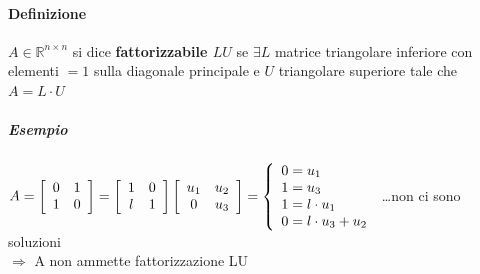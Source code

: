 \documentclass[10pt]{book}
\begin{document}
\paragraph{Definizione} $A \in \mathbb{R}^{n \times n}$ si dice \textbf{fattorizzabile $LU$} se $\exists L$ matrice triangolare inferiore con elementi $= 1$ sulla diagonale principale e $U$ triangolare superiore tale che $A = L\cdot U$
\subparagraph{Esempio} \begin{math}
A = \left[
\begin{array}{c c}
	0 & 1\\
	1 & 0
\end{array}
\right]
= \left[
\begin{array}{c c}
	1 & 0\\
	l & 1
\end{array}
\right]
\left[
\begin{array}{c c}
	u_1 & u_2\\
	0 & u_3
\end{array}
\right]
= \left\{
\begin{array}{l}
	0 = u_1\\
	1 = u_3\\
	1 = l\cdot u_1\\
	0 = l\cdot u_3 + u_2
\end{array}
\right.
\end{math}
\ldots non ci sono soluzioni\\
$\Rightarrow$ A non ammette fattorizzazione LU
\end{document}
